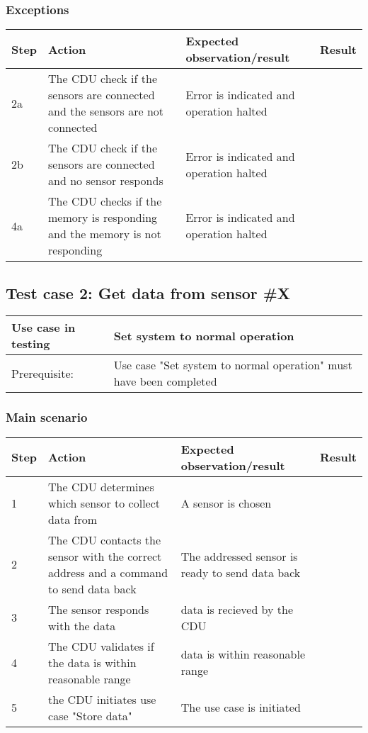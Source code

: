 \subsubsection{Exceptions}
\begin{table}[H]
    \begin{tabular}{|l|p{7cm}|p{5cm}|l|}
    \hline
    Step & Action & Expected observation/result & Result \\ \hline
    2a & The CDU check if the sensors are connected and the sensors are not connected & Error is indicated and operation halted & ~ \\ \hline
    2b & The CDU check if the sensors are connected and no sensor responds & Error is indicated and operation halted & ~ \\ \hline
    4a & The CDU checks if the memory is responding and the memory is not responding & Error is indicated and operation halted & ~ \\ \hline
    \end{tabular}
\end{table}

\subsection{Test case 2: Get data from sensor \#X}
\begin{table}[H]
    \begin{tabular}{|l|p{7cm}|}
    \hline
    Use case in testing & Set system to normal operation \\ \hline
    Prerequisite: & Use case "Set system to normal operation" must have been completed \\ \hline
    \end{tabular}
\end{table}

\subsubsection{Main scenario}
\begin{table}[H]
    \begin{tabular}{|l|p{7cm}|p{5cm}|l|}
    \hline
    Step & Action & Expected observation/result & Result \\ \hline
    1 & The CDU determines which sensor to collect data from & A sensor is chosen & ~ \\ \hline
    2 & The CDU contacts the sensor with the correct address and a command to send data back & The addressed sensor is ready to send data back & ~ \\ \hline
    3 & The sensor responds with the data & data is recieved by the CDU & ~ \\ \hline
    4 & The CDU validates if the data is within reasonable range & data is within reasonable range & ~ \\ \hline
    5 & the CDU initiates use case "Store data" & The use case is initiated & ~ \\ \hline
    \end{tabular}
\end{table}

